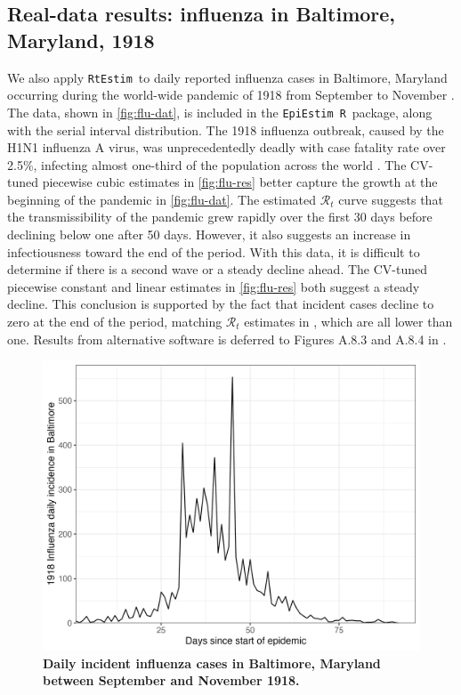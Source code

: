 \documentclass[10pt,letterpaper]{article}
\newcommand{\R}{\texttt{R}}
\def\RtEstim{\texttt{RtEstim}}
\def\EpiEstim{\texttt{EpiEstim}}
\def\calR{\mathcal{R}}
\begin{document}
\subsection{Real-data results: influenza in Baltimore, Maryland, 1918}

We also apply \RtEstim\ to daily reported influenza cases in Baltimore, Maryland
occurring during the world-wide pandemic of 1918 from September to November
\cite{frost1919influenza}. The data, shown in \autoref{fig:flu-dat}, is included
in the \EpiEstim\ \R\ package, along with the serial interval distribution. The
1918 influenza outbreak, caused by the H1N1 influenza A virus, was
unprecedentedly deadly with case fatality rate over 2.5\%, infecting almost
one-third of the population across the world \cite{taubenberger20061918}. The
CV-tuned piecewise cubic estimates in \autoref{fig:flu-res} better capture the
growth at the beginning of the pandemic in \autoref{fig:flu-dat}. The estimated
$\calR_t$ curve suggests that the transmissibility of the pandemic grew rapidly
over the first 30 days before declining below one after 50 days. However, it
also suggests an increase in infectiousness toward the end of the period. With
this data, it is difficult to determine if there is a second wave or a steady
decline ahead. The CV-tuned piecewise constant and linear estimates in
\autoref{fig:flu-res} both suggest a steady decline. This conclusion is
supported by the fact that incident cases decline to zero at the end of the
period, matching $\calR_t$ estimates in \cite{cori2013new}, which are all lower
than one. Results from alternative software is deferred to Figures A.8.3 and
A.8.4 in .

\begin{figure}[!t]
  \centering
  \includegraphics[width=1.0\linewidth]{fig/Fig8.png}
  \caption{{\bf Daily incident influenza cases in Baltimore, Maryland between September 
  and November 1918.}} 
  \label{fig:flu-dat}
\end{figure} 
\end{document}
